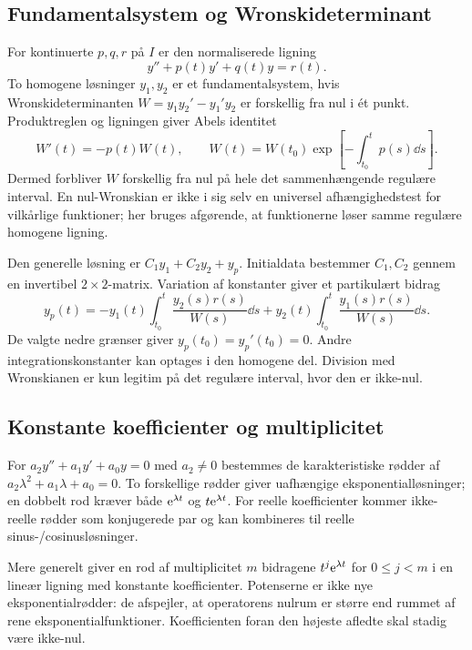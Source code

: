\subsection{Fundamentalsystem og Wronskideterminant}
For kontinuerte $p,q,r$ på $I$ er den normaliserede ligning
\[
 y''+p(t)y'+q(t)y=r(t).
\]
To homogene løsninger $y_1,y_2$ er et fundamentalsystem, hvis
Wronskideterminanten $W=y_1y_2'-y_1'y_2$ er forskellig fra nul i ét
punkt. Produktreglen og ligningen giver Abels identitet
\[
 W'(t)=-p(t)W(t),\qquad
 W(t)=W(t_0)\exp\!\left[-\int_{t_0}^{t}p(s)\dd s\right].
\]
Dermed forbliver $W$ forskellig fra nul på hele det sammenhængende
regulære interval. En nul-Wronskian er ikke i sig selv en universel
afhængighedstest for vilkårlige funktioner; her bruges afgørende, at
funktionerne løser samme regulære homogene ligning.

Den generelle løsning er $C_1y_1+C_2y_2+y_p$. Initialdata bestemmer
$C_1,C_2$ gennem en invertibel $2\times2$-matrix. Variation af konstanter
giver et partikulært bidrag
\begin{equation}
 y_p(t)=-y_1(t)\int_{t_0}^{t}\frac{y_2(s)r(s)}{W(s)}\dd s
        +y_2(t)\int_{t_0}^{t}\frac{y_1(s)r(s)}{W(s)}\dd s.
 \label{eq:ode-variation-scalar}
\end{equation}
De valgte nedre grænser giver $y_p(t_0)=y_p'(t_0)=0$. Andre
integrationskonstanter kan optages i den homogene del. Division med
Wronskianen er kun legitim på det regulære interval, hvor den er ikke-nul.

\subsection{Konstante koefficienter og multiplicitet}
For $a_2y''+a_1y'+a_0y=0$ med $a_2\ne0$ bestemmes de
karakteristiske rødder af $a_2\lambda^2+a_1\lambda+a_0=0$.
To forskellige rødder giver uafhængige eksponentialløsninger;
en dobbelt rod kræver både $\mathrm{e}^{\lambda t}$ og $t\mathrm{e}^{\lambda t}$.
For reelle koefficienter kommer ikke-reelle rødder som konjugerede par
og kan kombineres til reelle sinus-/cosinusløsninger.

Mere generelt giver en rod af multiplicitet $m$ bidragene
$t^j\mathrm{e}^{\lambda t}$ for $0\le j<m$ i en lineær ligning med konstante
koefficienter. Potenserne er ikke nye eksponentialrødder: de afspejler,
at operatorens nulrum er større end rummet af rene eksponentialfunktioner.
Koefficienten foran den højeste afledte skal stadig være ikke-nul.

